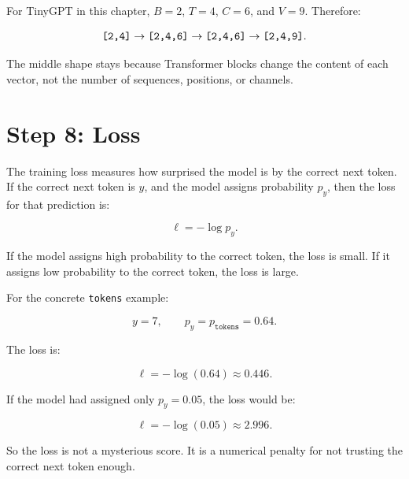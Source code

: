 For TinyGPT in this chapter, \(B=2\), \(T=4\), \(C=6\), and \(V=9\). Therefore:

\[
\texttt{[2,4]} \rightarrow \texttt{[2,4,6]} \rightarrow \texttt{[2,4,6]} \rightarrow \texttt{[2,4,9]}.
\]

The middle shape stays \shape{[B,T,C]} because Transformer blocks change the content of each vector, not the number of sequences, positions, or channels.

\section{Step 8: Loss}

The training loss measures how surprised the model is by the correct next token. If the correct next token is \(y\), and the model assigns probability \(p_y\), then the loss for that prediction is:

\[
\ell = -\log p_y.
\]

If the model assigns high probability to the correct token, the loss is small. If it assigns low probability to the correct token, the loss is large.

For the concrete \texttt{tokens} example:

\[
y = 7,\qquad p_y = p_{\texttt{tokens}} = 0.64.
\]

The loss is:

\[
\ell = -\log(0.64) \approx 0.446.
\]

If the model had assigned only \(p_y=0.05\), the loss would be:

\[
\ell = -\log(0.05) \approx 2.996.
\]

So the loss is not a mysterious score. It is a numerical penalty for not trusting the correct next token enough.

\begin{center}
\end{center}

